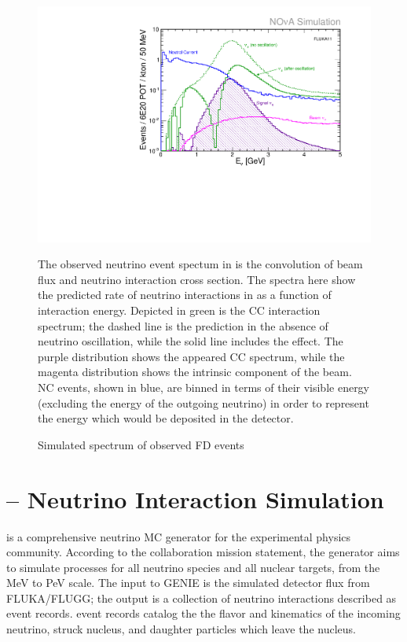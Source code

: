 \begin{figure}
\begin{center}
\includegraphics[width=\textwidth]{figures/plots/nova/beam_flux_log.pdf}
\end{center}
\caption{Simulated spectrum of observed FD events}{
The observed neutrino event spectum in \nova is the convolution
of \numi beam flux and neutrino interaction cross section.
The spectra here show the predicted rate of neutrino interactions
in \nova as a function of interaction energy.
Depicted in green is the \numu CC interaction spectrum; the dashed line
is the prediction in the absence of neutrino oscillation, while
the solid line includes the effect.
The purple distribution shows the appeared \nue CC spectrum,
while the magenta distribution shows the intrinsic \nue component
of the beam.
NC events, shown in blue, are binned in terms of their visible energy
(excluding the energy of the outgoing neutrino) in order to represent
the energy which would be deposited in the detector.
}
\label{beam_flux_fig}
\end{figure}



\section{\genie -- Neutrino Interaction Simulation}
\label{genie_section}

\genie is a comprehensive neutrino MC generator for the experimental physics community.
According to the \genie collaboration mission statement, the
generator aims to simulate processes  for all neutrino species and all nuclear targets, from the MeV to PeV scale.  The input to GENIE is the simulated detector flux from FLUKA/FLUGG; the output is a collection of neutrino interactions described as \genie event records.  \genie event records catalog the the flavor and kinematics of the incoming neutrino, struck nucleus, and daughter particles which leave the nucleus.

